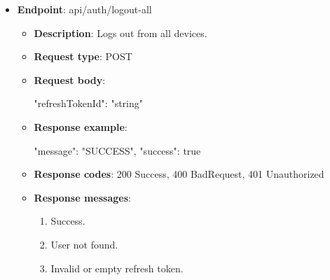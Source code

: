 \begin{itemize}
    \item \textbf{Endpoint}: api/auth/logout-all
    \begin{itemize}
        \item \textbf{Description}: Logs out from all devices.
        \item \textbf{Request type}: POST
        \item \textbf{Request body}:
        \begin{spverbatim}
        {
            "refreshTokenId": "string"
        }
        \end{spverbatim}
        \item \textbf{Response example}:
        \begin{spverbatim}
        {
            "message": "SUCCESS",
            "success": true
        }
        \end{spverbatim}
        \item \textbf{Response codes}: 200 Success, 400 BadRequest, 401 Unauthorized
        \item \textbf{Response messages}:
        \begin{enumerate}
            \item Success.
            \item User not found.
            \item Invalid or empty refresh token.
        \end{enumerate}
    \end{itemize}

\end{itemize}

